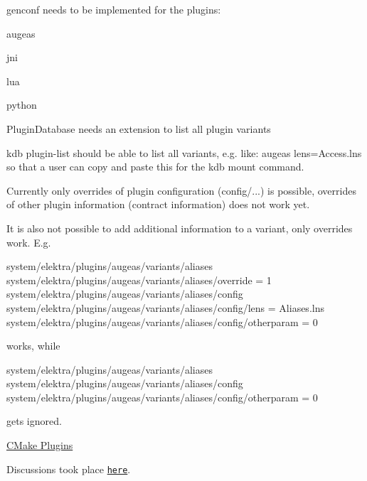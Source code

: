 \begin{DoxyItemize}
\item {\ttfamily genconf} needs to be implemented for the plugins\+:
\begin{DoxyItemize}
\item augeas
\item jni
\item lua
\item python
\end{DoxyItemize}
\item {\ttfamily Plugin\+Database} needs an extension to list all plugin variants
\item {\ttfamily kdb plugin-\/list} should be able to list all variants, e.\+g. like\+: {\ttfamily augeas lens=Access.\+lns} so that a user can copy and paste this for the {\ttfamily kdb mount} command.
\end{DoxyItemize}

Currently only overrides of plugin configuration ({\ttfamily config/...}) is possible, overrides of other plugin information (contract information) does not work yet.

It is also not possible to add additional information to a variant, only overrides work. E.\+g.


\begin{DoxyCode}
system/elektra/plugins/augeas/variants/aliases
system/elektra/plugins/augeas/variants/aliases/override = 1
system/elektra/plugins/augeas/variants/aliases/config
system/elektra/plugins/augeas/variants/aliases/config/lens = Aliases.lns
system/elektra/plugins/augeas/variants/aliases/config/otherparam = 0
\end{DoxyCode}


works, while


\begin{DoxyCode}
system/elektra/plugins/augeas/variants/aliases
system/elektra/plugins/augeas/variants/aliases/config
system/elektra/plugins/augeas/variants/aliases/config/otherparam = 0
\end{DoxyCode}


gets ignored.


\begin{DoxyItemize}
\item \hyperlink{doc_decisions_cmake_plugins_md}{C\+Make Plugins}
\end{DoxyItemize}

Discussions took place \href{https://git.libelektra.org/issues/1006}{\tt here}. 